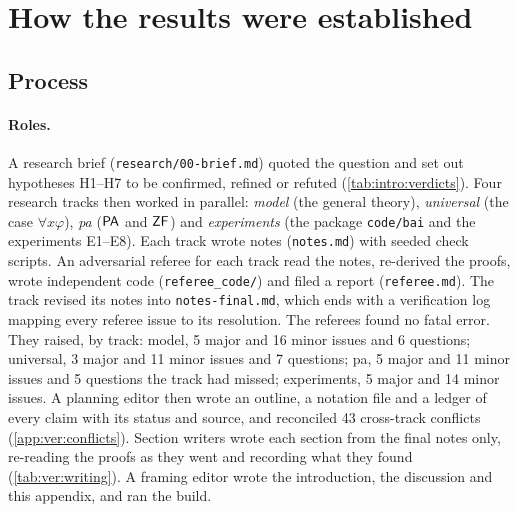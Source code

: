 
\clearpage %
\section{How the results were established}\label{app:ver}

\subsection{Process}\label{app:ver:process}

\paragraph{Roles.} A research brief (\texttt{research/00-brief.md}) quoted the question and set out hypotheses H1--H7 to be confirmed, refined or refuted (\cref{tab:intro:verdicts}). Four research tracks then worked in parallel: \emph{model} (the general theory), \emph{universal} (the case $\forall x\varphi$), \emph{pa} ($\mathsf{PA}$ and $\mathsf{ZF}$) and \emph{experiments} (the package \texttt{code/bai} and the experiments E1--E8). Each track wrote notes (\texttt{notes.md}) with seeded check scripts. An adversarial referee for each track read the notes, re-derived the proofs, wrote independent code (\texttt{referee\_code/}) and filed a report (\texttt{referee.md}). The track revised its notes into \texttt{notes-final.md}, which ends with a verification log mapping every referee issue to its resolution. The referees found no fatal error. They raised, by track: model, 5 major and 16 minor issues and 6 questions; universal, 3 major and 11 minor issues and 7 questions; pa, 5 major and 11 minor issues and 5 questions the track had missed; experiments, 5 major and 14 minor issues. A planning editor then wrote an outline, a notation file and a ledger of every claim with its status and source, and reconciled 43 cross-track conflicts (\cref{app:ver:conflicts}). Section writers wrote each section from the final notes only, re-reading the proofs as they went and recording what they found (\cref{tab:ver:writing}). A framing editor wrote the introduction, the discussion and this appendix, and ran the build.

